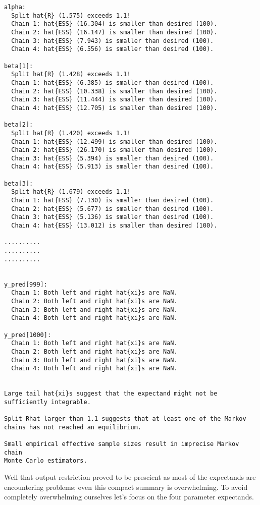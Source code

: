 \documentclass[
  letterpaper,
  DIV=11,
  numbers=noendperiod]{scrartcl}
\begin{document}
\begin{verbatim}
alpha:
  Split hat{R} (1.575) exceeds 1.1!
  Chain 1: hat{ESS} (16.304) is smaller than desired (100).
  Chain 2: hat{ESS} (16.147) is smaller than desired (100).
  Chain 3: hat{ESS} (7.943) is smaller than desired (100).
  Chain 4: hat{ESS} (6.556) is smaller than desired (100).

beta[1]:
  Split hat{R} (1.428) exceeds 1.1!
  Chain 1: hat{ESS} (6.385) is smaller than desired (100).
  Chain 2: hat{ESS} (10.338) is smaller than desired (100).
  Chain 3: hat{ESS} (11.444) is smaller than desired (100).
  Chain 4: hat{ESS} (12.705) is smaller than desired (100).

beta[2]:
  Split hat{R} (1.420) exceeds 1.1!
  Chain 1: hat{ESS} (12.499) is smaller than desired (100).
  Chain 2: hat{ESS} (26.170) is smaller than desired (100).
  Chain 3: hat{ESS} (5.394) is smaller than desired (100).
  Chain 4: hat{ESS} (5.913) is smaller than desired (100).

beta[3]:
  Split hat{R} (1.679) exceeds 1.1!
  Chain 1: hat{ESS} (7.130) is smaller than desired (100).
  Chain 2: hat{ESS} (5.677) is smaller than desired (100).
  Chain 3: hat{ESS} (5.136) is smaller than desired (100).
  Chain 4: hat{ESS} (13.012) is smaller than desired (100).

..........
..........
..........


y_pred[999]:
  Chain 1: Both left and right hat{xi}s are NaN.
  Chain 2: Both left and right hat{xi}s are NaN.
  Chain 3: Both left and right hat{xi}s are NaN.
  Chain 4: Both left and right hat{xi}s are NaN.

y_pred[1000]:
  Chain 1: Both left and right hat{xi}s are NaN.
  Chain 2: Both left and right hat{xi}s are NaN.
  Chain 3: Both left and right hat{xi}s are NaN.
  Chain 4: Both left and right hat{xi}s are NaN.


Large tail hat{xi}s suggest that the expectand might not be
sufficiently integrable.

Split Rhat larger than 1.1 suggests that at least one of the Markov
chains has not reached an equilibrium.

Small empirical effective sample sizes result in imprecise Markov chain
Monte Carlo estimators.
\end{verbatim}

Well that output restriction proved to be prescient as most of the
expectands are encountering problems; even this compact summary is
overwhelming. To avoid completely overwhelming ourselves let's focus on
the four parameter expectands.
\end{document}
